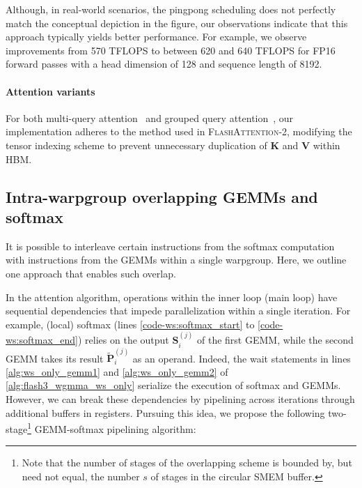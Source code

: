 Although, in real-world scenarios, the pingpong scheduling does not perfectly match the conceptual depiction in the figure, our observations indicate that this approach typically yields better performance. For example, we observe improvements from 570 TFLOPS to between 620 and 640 TFLOPS for FP16 forward passes with a head dimension of 128 and sequence length of 8192.

\paragraph{Attention variants} For both multi-query attention~\citep{shazeer2019fast} and grouped query attention~\citep{ainslie2023gqa}, our implementation adheres to the method used in \textsc{FlashAttention-2}, modifying the tensor indexing scheme to prevent unnecessary duplication of $\mathbf{K}$ and $\mathbf{V}$ within HBM.

\subsection{Intra-warpgroup overlapping GEMMs and softmax}

It is possible to interleave certain instructions from the softmax computation with instructions from the GEMMs within a single warpgroup. Here, we outline one approach that enables such overlap.

In the attention algorithm, operations within the inner loop (main loop) have sequential dependencies that impede parallelization within a single iteration. For example, (local) softmax (lines \ref{code-ws:softmax_start} to \ref{code-ws:softmax_end}) relies on the output $\mathbf{S}_i^{(j)}$ of the first GEMM, while the second GEMM takes its result $\widetilde{\mathbf{P}}_i^{(j)}$ as an operand. Indeed, the wait statements in lines \ref{alg:ws_only_gemm1} and \ref{alg:ws_only_gemm2} of \cref{alg:flash3_wgmma_ws_only} serialize the execution of softmax and GEMMs. However, we can break these dependencies by pipelining across iterations through additional buffers in registers. Pursuing this idea, we propose the following two-stage\footnote{Note that the number of stages of the overlapping scheme is bounded by, but need not equal, the number $s$ of stages in the circular SMEM buffer.} GEMM-softmax pipelining algorithm:

